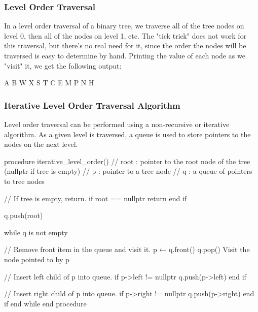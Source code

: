 \documentclass{report}
\begin{document}
    \pagebreak 
    \subsubsection{Level Order Traversal}
    \bigbreak \noindent 
    In a level order traversal of a binary tree, we traverse all of the tree nodes on level 0, then all of the nodes on level 1, etc. The "tick trick" does not work for this traversal, but there's no real need for it, since the order the nodes will be traversed is easy to determine by hand.
    \bigbreak \noindent 
    \bigbreak \noindent 
    Printing the value of each node as we "visit" it, we get the following output:
    \begin{center}
        A B W X S T C E M P N H
    \end{center}
    \pagebreak 
    \subsubsection{Iterative Level Order Traversal Algorithm}
    \bigbreak \noindent 
    Level order traversal can be performed using a non-recursive or iterative algorithm. As a given level is traversed, a queue is used to store pointers to the nodes on the next level.
    \bigbreak \noindent 
    \begin{cppcode}
    procedure iterative_level_order()
        // root : pointer to the root node of the tree (nullptr if tree is empty)
        // p    : pointer to a tree node
        // q    : a queue of pointers to tree nodes
        
        // If tree is empty, return.
        if root == nullptr
            return
        end if
        
        q.push(root)
        
        while q is not empty
        
            // Remove front item in the queue and visit it.
            p ← q.front()
            q.pop()
            Visit the node pointed to by p
            
            // Insert left child of p into queue.
            if p->left != nullptr
                q.push(p->left)
            end if

            // Insert right child of p into queue.
            if p->right != nullptr
                q.push(p->right)
            end if
        end while
    end procedure
    \end{cppcode}
\end{document}
